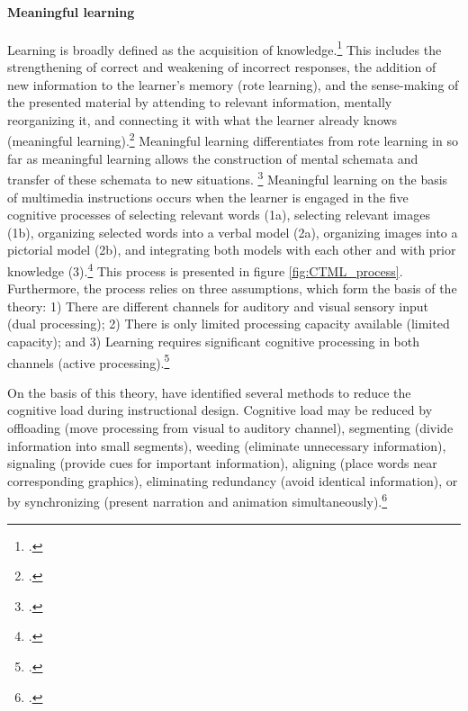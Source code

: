 \paragraph{Meaningful learning} Learning is broadly defined as the acquisition of knowledge.\footcites[Cf.][p.226]{MayerRotemeaningfullearning2002} This includes the strengthening of correct and weakening of incorrect responses, the addition of new information to the learner's memory (rote learning), and the sense-making of the presented material by attending to relevant information, mentally reorganizing it, and connecting it with what the learner already knows (meaningful learning).\footcites[Cf.][chapter 2, paragraph 5]{ClarkElearningscienceinstruction2016} Meaningful learning differentiates from rote learning in so far as meaningful learning allows the construction of mental schemata and transfer of these schemata to new situations.%
\footcites[Cf.][p.227]{MayerRotemeaningfullearning2002}[cf.][p.299]{SwellerCognitiveloadtheory1994} Meaningful learning on the basis of multimedia instructions occurs when the learner is engaged in the five cognitive processes of selecting relevant words (1a), selecting relevant images (1b), organizing selected words into a verbal model (2a), organizing images into a pictorial model (2b), and integrating both models with each other and with prior knowledge (3).\footcites[Cf.][p.111]{MayerCognitiveTheoryMultimedia1999}[cf.][p.35]{SordenCognitiveTheoryMultimedia2012}[cf.][p.43]{MayerNineWaysReduce2003} This process is presented in figure \ref{fig:CTML_process}. Furthermore, the process relies on three assumptions, which form the basis of the theory: 1) There are different channels for auditory and visual sensory input (dual processing); 2) There is only limited processing capacity available (limited capacity); and 3) Learning requires significant cognitive processing in both channels (active processing).\footcites[Cf.][p.44]{MayerNineWaysReduce2003}

On the basis of this theory, \cite{MayerNineWaysReduce2003} have identified several methods to reduce the cognitive load during instructional design. Cognitive load may be reduced by offloading (move processing from visual to auditory channel), segmenting (divide information into small segments), weeding (eliminate unnecessary information), signaling (provide cues for important information), aligning (place words near corresponding graphics), eliminating redundancy (avoid identical information), or by synchronizing (present narration and animation simultaneously).\footcites[Cf.][p.46]{MayerNineWaysReduce2003}

